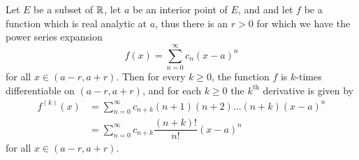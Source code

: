 \setcounter{thm}{5}
\begin{prop}\label{4.2.6}
  Let \(E\) be a subset of \(\mathbb{R}\), let \(a\) be an interior point of \(E\), and and let \(f\) be a function which is real analytic at \(a\), thus there is an \(r > 0\) for which we have the power series expansion
  \[
    f(x) = \sum_{n = 0}^\infty c_n (x - a)^n
  \]
  for all \(x \in (a - r, a + r)\).
  Then for every \(k \geq 0\), the function \(f\) is \(k\)-times differentiable on \((a - r, a + r)\), and for each \(k \geq 0\) the \(k^{\text{th}}\) derivative is given by
  \begin{align*}
    f^{(k)}(x) & = \sum_{n = 0}^\infty c_{n + k} (n + 1) (n + 2) \dots (n + k) (x - a)^n \\
               & = \sum_{n = 0}^\infty c_{n + k} \dfrac{(n + k)!}{n!} (x - a)^n
  \end{align*}
  for all \(x \in (a - r, a + r)\).
\end{prop}

